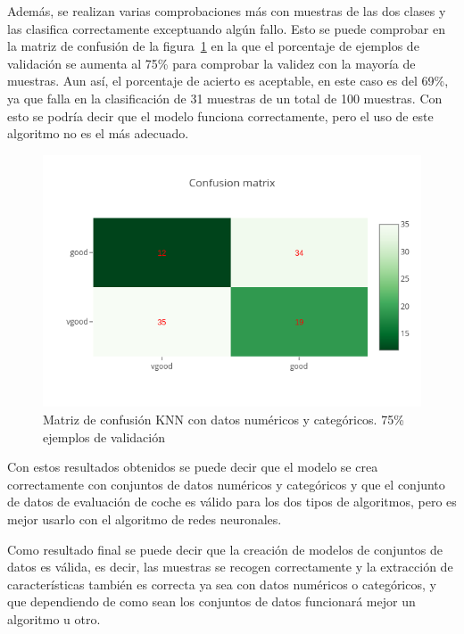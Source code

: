 \documentclass[a4paper, 12pt]{book}
\begin{document}
Además, se realizan varias comprobaciones más con muestras de las dos clases y las clasifica correctamente exceptuando algún fallo. Esto se puede comprobar en la matriz de confusión de la figura~\ref{fig:ejemplo26} en la que el porcentaje de ejemplos de validación se aumenta al 75\% para comprobar la validez con la mayoría de muestras. 
Aun así, el porcentaje de acierto es aceptable, en este caso es del 69\%, ya que falla en la clasificación de 31 muestras de un total de 100 muestras. Con esto se podría decir que el modelo funciona correctamente, pero el uso de este algoritmo no es el más adecuado.

\begin{figure}
	\centering
	\includegraphics[width=12cm, keepaspectratio]{img/cm_numycat_knn2.png}
	\caption{Matriz de confusión KNN con datos numéricos y categóricos. 75\% ejemplos de validación} 	
	\label{fig:ejemplo26}
\end{figure}

Con estos resultados obtenidos se puede decir que el modelo se crea correctamente con conjuntos de datos numéricos y categóricos y que el conjunto de datos de evaluación de coche es válido para los dos tipos de algoritmos, pero es mejor usarlo con el algoritmo de redes neuronales.

Como resultado final se puede decir que la creación de modelos de conjuntos de datos es válida, es decir, las muestras se recogen correctamente y la extracción de características también es correcta ya sea con datos numéricos o categóricos, y que dependiendo de como sean los conjuntos de datos funcionará mejor un algoritmo u otro.




\end{document}
